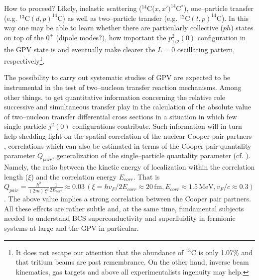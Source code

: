 \documentclass[a4paper,11pt]{article}
\numberwithin{equation}{section}
\numberwithin{figure}{section}
\numberwithin{table}{section}
\begin{document}
How to proceed? Likely, inelastic scattering ($^{14}$C($x,x')^{14}$C$^*$), one--particle transfer (e.g. $^{13}$C$(d,p)^{14}$C) as well as two--particle transfer (e.g. $^{12}$C$(t,p)^{14}$C). In this way one may be able to learn whether there are particularly collective ($ph$) states on top of the $0^+$ (dipole modes?), how important the $p^2_{1/2}(0)$ configuration in the GPV state is and eventually make clearer the $L=0$ oscillating pattern, respectively\footnote{It does not escape our attention that the abundance of $^{13}$C is only 1.07\% and that tritium beams are past remembrance. On the other hand, inverse beam kinematics, gas targets and above all experimentalists ingenuity may help.}.

   The possibility to carry out systematic studies of GPV are expected to be  instrumental in the test of two--nucleon transfer reaction mechanisms. Among other things, to get quantitative information concerning the relative role successive and simultaneous transfer play in the calculation of the absolute value of two--nucleon transfer differential cross sections in a situation in which few single particle $j^2(0)$ configurations contribute. Such information will in turn help shedding light on the spatial correlation of the nuclear Cooper pair partners  \cite{Bertsch:67,Ferreira:84,Herzog:85,Lotti:89}, correlations which can also be estimated in terms of the Cooper pair quantality parameter $Q_{pair}$, generalization of the single--particle quantality parameter (cf. \cite{Mottelson:02}). Namely, the ratio between the kinetic energy of localization within the correlation length ($\xi$) and the correlation energy $E_{corr}$. That is $Q_{pair}=\frac{\hbar^2}{(2m)\,\xi^2}\frac{1}{2E_{corr}}\approx0.03\,(\xi=\hbar v_F/2E_{corr}\approx20\,\text{fm}, E_{corr}\approx 1.5 \,\text{MeV}, v_F/c\approx 0.3)$. The above value implies a strong correlation between the Cooper pair partners. All these effects are rather subtle  \cite{Josephson:62,Bardeen:62,Pippard:12,Anderson:64b,Cohen:62,Brink:05} and, at the same time, fundamental subjects needed to understand BCS superconductivity and superfluidity in fermionic systems at large and the GPV in particular.
\end{document}
